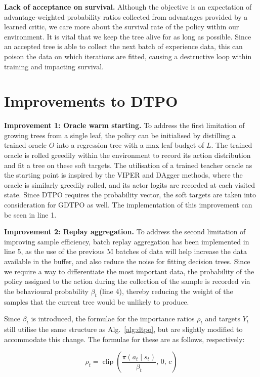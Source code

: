 \textbf{Lack of acceptance on survival.} Although the objective is an expectation of advantage-weighted probability ratios collected from advantages provided by a learned critic, we care more about the survival rate of the policy within our environment. It is vital that we keep the tree alive for as long as possible. Since an accepted tree is able to collect the next batch of experience data, this can poison the data on which iterations are fitted, causing a destructive loop within training and impacting survival. 

\section{Improvements to DTPO}

\textbf{Improvement 1: Oracle warm starting.} To address the first limitation of growing trees from a single leaf, the policy can be initialised by distilling a trained oracle $O$ into a regression tree with a max leaf budget of $L$. The trained oracle is rolled greedily within the environment to record its action distribution and fit a tree on these soft targets. The utilisation of a trained teacher oracle as the starting point is inspired by the VIPER and DAgger methods, where the oracle is similarly greedily rolled, and its actor logits are recorded at each visited state. Since DTPO requires the probability vector, the soft targets are taken into consideration for GDTPO as well. The implementation of this improvement can be seen in line 1.

\textbf{Improvement 2: Replay aggregation.} To address the second limitation of improving sample efficiency, batch replay aggregation has been implemented in line 5, as the use of the previous M batches of data will help increase the data available in the buffer, and also reduce the noise for fitting decision trees. Since we require a way to differentiate the most important data, the probability of the policy assigned to the action during the collection of the sample is recorded via the behavioural probability $\beta_t$ (line 4), thereby reducing the weight of the samples that the current tree would be unlikely to produce.

Since $\beta_t$ is introduced, the formulae for the importance ratios $\rho_t$ and targets $Y_t$ still utilise the same structure as Alg.~\ref{alg:dtpo}, but are slightly modified to accommodate this change. The formulae for these are as follows, respectively:

\begin{equation}
\rho_t = \operatorname{clip}\!\left(\frac{\pi(a_t \mid s_t)}{\beta_t},\, 0,\, c\right)
\label{eq:rho}
\end{equation}

